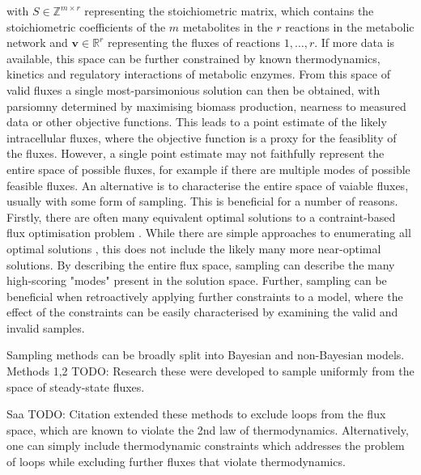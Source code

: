 \documentclass[10pt,letterpaper]{article}
\begin{document}
with $S \in \mathbb{Z}^{m\times r}$ representing the stoichiometric matrix, which contains the stoichiometric coefficients of the $m$ metabolites in the $r$ reactions in the metabolic network and $\mathbf{v} \in \mathbb{R}^r$ representing the fluxes of reactions $1,\dots,r$.
If more data is available, this space can be further constrained by known thermodynamics, kinetics and regulatory interactions of metabolic enzymes.
From this space of valid fluxes a single most-parsimonious solution can then be obtained, with parsiomny determined by maximising biomass production, nearness to measured data or other objective functions.
This leads to a point estimate of the likely intracellular fluxes, where the objective function is a proxy for the feasiblity of the fluxes.
However, a single point estimate may not faithfully represent the entire space of possible fluxes, for example if there are multiple modes of possible feasible fluxes.
An alternative is to characterise the entire space of vaiable fluxes, usually with some form of sampling.
This is beneficial for a number of reasons.
Firstly, there are often many equivalent optimal solutions to a contraint-based flux optimisation problem \cite{many_optimal}.
While there are simple approaches to enumerating all optimal solutions \cite{enumerate_optimal}, this does not include the likely many more near-optimal solutions.
By describing the entire flux space, sampling can describe the many high-scoring "modes" present in the solution space.
Further, sampling can be beneficial when retroactively applying further constraints to a model, where the effect of the constraints can be easily characterised by examining the valid and invalid samples.

Sampling methods can be broadly split into Bayesian and non-Bayesian models.
Methods 1,2 {TODO: Research these} were developed to sample uniformly from the space of steady-state fluxes.


Saa {TODO: Citation} extended these methods to exclude loops from the flux space, which are known to violate the 2nd law of thermodynamics.
Alternatively, one can simply include thermodynamic constraints which addresses the problem of loops while excluding further fluxes that violate thermodynamics.

\end{document}
